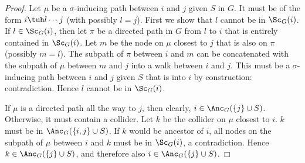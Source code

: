 \begin{proof}
  Let $\mu$ be a $\sigma$-inducing path between $i$ and $j$ given $S$ in $G$. 
  It must be of the form $i \tuh l \cdots j$ (with possibly $l = j$). 
  First we show that $l$ cannot be in $\Sc_G(i)$.
  If $l \in \Sc_G(i)$, then let $\pi$ be a directed path in $G$ from $l$ to $i$ that is entirely contained in $\Sc_G(i)$.
  Let $m$ be the node on $\mu$ closest to $j$ that is also on $\pi$ (possibly $m = l$).
  The subpath of $\pi$ between $i$ and $m$ can be concatenated with the subpath of $\mu$ between $m$ and $j$ into a walk between $i$ and $j$.
  This must be a $\sigma$-inducing path between $i$ and $j$ given $S$ that is into $i$ by construction: contradiction.
  Hence $l$ cannot be in $\Sc_G(i)$.

  If $\mu$ is a directed path all the way to $j$, then clearly, $i \in \Anc_G(\{j\} \cup S)$.
  Otherwise, it must contain a collider. 
  Let $k$ be the collider on $\mu$ closest to $i$.
  $k$ must be in $\Anc_G(\{i,j\} \cup S)$.
  If $k$ would be ancestor of $i$, all nodes on the subpath of $\mu$ between $i$ and $k$ must be in $\Sc_G(i)$, a contradiction.
  Hence $k \in \Anc_G(\{j\} \cup S)$, and therefore also $i \in \Anc_G(\{j\} \cup S)$.
\end{proof}

